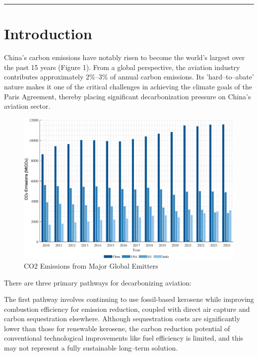 \documentclass[a4paper,11pt]{article}
\begin{document}
\vspace{1em}
\hrule
\vspace{1.5em}


\newpage
\section{Introduction}
China's carbon emissions have notably risen to become the world's largest over the past 15 years (Figure 1). From a global perspective, the aviation industry contributes approximately 2\%--3\% of annual carbon emissions. Its 'hard--to--abate' nature makes it one of the critical challenges in achieving the climate goals of the Paris Agreement, thereby placing significant decarbonization pressure on China's aviation sector.



\begin{figure}[htbp]
    \centering
    \includegraphics[width=0.9\linewidth]{global_co2_emissions.eps}
    \caption{CO2 Emissions from Major Global Emitters}
    \label{fig:co2_emissions}
\end{figure}


There are three primary pathways for decarbonizing aviation:

The first pathway involves continuing to use fossil-based kerosene while improving combustion efficiency for emission reduction, coupled with direct air capture and carbon sequestration elsewhere. Although sequestration costs are significantly lower than those for renewable kerosene, the carbon reduction potential of conventional technological improvements like fuel efficiency is limited, and this may not represent a fully sustainable long--term solution.
\end{document}
